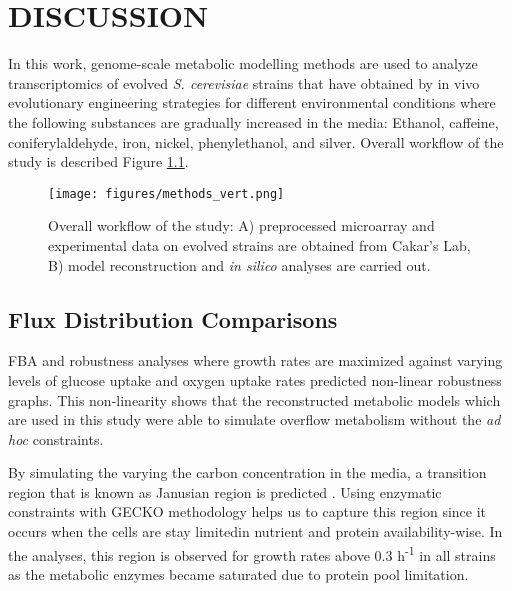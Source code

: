 \chapter{DISCUSSION}

In this work, genome-scale metabolic modelling methods are used to analyze transcriptomics of evolved \emph{S. cerevisiae} strains that have obtained by in vivo evolutionary engineering strategies for different environmental conditions where the following substances are gradually increased in the media: Ethanol, caffeine, coniferylaldehyde, iron, nickel, phenylethanol, and silver. Overall workflow of the study is described Figure \ref{fig:methods}.


\begin{figure} [H]
  \begin{center}
  \texttt{[image: figures/methods\_vert.png]}
  \caption[Overall workflow of the study: A) preprocessed microarray and experimental data on evolved strains are obtained from Cakar's Lab, B) model reconstruction and \emph{in silico} analyses are carried out.]{Overall workflow of the study: A) preprocessed microarray and experimental data on evolved strains are obtained from Cakar's Lab, B) model reconstruction and \emph{in silico} analyses are carried out. }
  \label{fig:methods}
  \end{center}
\end{figure}

\section{Flux Distribution Comparisons}
FBA and robustness analyses where growth rates are maximized against varying levels of glucose uptake and oxygen uptake rates predicted non-linear robustness graphs. This non-linearity shows that the reconstructed metabolic models which are used in this study were able to simulate overflow metabolism without the \emph{ad hoc} constraints.

By simulating the varying the carbon concentration in the media, a transition region that is known as Janusian region is predicted \cite{buttonbiochemical}. Using enzymatic constraints with GECKO methodology helps us to capture this region since it occurs when the cells are stay limitedin nutrient and protein availability-wise. In the analyses, this region is observed for growth rates above 0.3 h\textsuperscript{-1} in all strains as the metabolic enzymes became saturated due to protein pool limitation.

